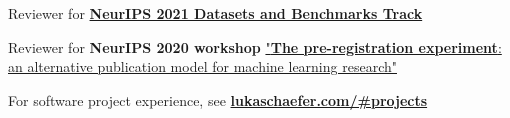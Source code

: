 \documentclass[]{lukas-cv-openfont}
\begin{document}
\noindent
\begin{tightitemize}{1.0em}
\item Reviewer for \href{https://openreview.net/group?id=NeurIPS.cc/2021/Track/Datasets_and_Benchmarks/Round1}{\textbf{NeurIPS 2021 Datasets and Benchmarks Track}}
\item Reviewer for \textbf{NeurIPS 2020 workshop} \href{https://preregister.science/}{"\textbf{The pre-registration experiment}: an alternative publication model for machine learning research"}
\end{tightitemize}
\sectionsep


\begin{flushleft}
    For software project experience, see \href{https://www.lukaschaefer.com/#projects}{\textbf{lukaschaefer.com/\#projects}}
\end{flushleft}
\largesectionsep



\end{document}
